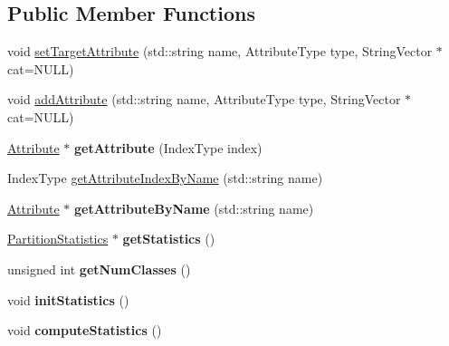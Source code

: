 \subsection*{Public Member Functions}
\begin{DoxyCompactItemize}
\item 
void \hyperlink{classffactory_1_1_dataset_a199736337b12e0ac97fd36993e00d44b}{set\-Target\-Attribute} (std\-::string name, Attribute\-Type type, String\-Vector $\ast$cat=N\-U\-L\-L)
\item 
void \hyperlink{classffactory_1_1_dataset_aee6bb477f697731452a16dcdfdd634e5}{add\-Attribute} (std\-::string name, Attribute\-Type type, String\-Vector $\ast$cat=N\-U\-L\-L)
\item 
\hypertarget{classffactory_1_1_dataset_aa5f194a2d71d7662df8c94c2f8b18644}{\hyperlink{classffactory_1_1_attribute}{Attribute} $\ast$ {\bfseries get\-Attribute} (Index\-Type index)}\label{classffactory_1_1_dataset_aa5f194a2d71d7662df8c94c2f8b18644}

\item 
Index\-Type \hyperlink{classffactory_1_1_dataset_a4fb9e8d154fab278c89765e979f12cfe}{get\-Attribute\-Index\-By\-Name} (std\-::string name)
\item 
\hypertarget{classffactory_1_1_dataset_a94f784fa41222351ff541847265d964c}{\hyperlink{classffactory_1_1_attribute}{Attribute} $\ast$ {\bfseries get\-Attribute\-By\-Name} (std\-::string name)}\label{classffactory_1_1_dataset_a94f784fa41222351ff541847265d964c}

\item 
\hypertarget{classffactory_1_1_dataset_a2c807fcff912bb178613429f8befb50e}{\hyperlink{classffactory_1_1_partition_statistics}{Partition\-Statistics} $\ast$ {\bfseries get\-Statistics} ()}\label{classffactory_1_1_dataset_a2c807fcff912bb178613429f8befb50e}

\item 
\hypertarget{classffactory_1_1_dataset_a4a3cced96905be07b23ae2a33cbe8a63}{unsigned int {\bfseries get\-Num\-Classes} ()}\label{classffactory_1_1_dataset_a4a3cced96905be07b23ae2a33cbe8a63}

\item 
\hypertarget{classffactory_1_1_dataset_a6ba6095ed22d5cae25ff497d21be1cba}{void {\bfseries init\-Statistics} ()}\label{classffactory_1_1_dataset_a6ba6095ed22d5cae25ff497d21be1cba}

\item 
\hypertarget{classffactory_1_1_dataset_a5bcea50dae4da648a15104e9283a6fce}{void {\bfseries compute\-Statistics} ()}\label{classffactory_1_1_dataset_a5bcea50dae4da648a15104e9283a6fce}


\end{DoxyCompactItemize}
